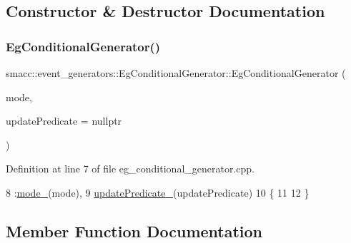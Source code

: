\subsection{Constructor \& Destructor Documentation}
\mbox{\label{classsmacc_1_1event__generators_1_1EgConditionalGenerator_aa21daec9774431387845be23fbcdfaa2}} 
\subsubsection{\texorpdfstring{Eg\+Conditional\+Generator()}{EgConditionalGenerator()}}
{\footnotesize\ttfamily smacc\+::event\+\_\+generators\+::\+Eg\+Conditional\+Generator\+::\+Eg\+Conditional\+Generator (\begin{DoxyParamCaption}\item[{\hyperlink{namespacesmacc_1_1event__generators_a1a57548759d7458f91c299f4fc2c5ea4}{Conditional\+Generator\+Mode}}]{mode,  }\item[{std\+::function$<$ \hyperlink{classbool}{bool}()$>$}]{update\+Predicate = {\ttfamily nullptr} }\end{DoxyParamCaption})}



Definition at line 7 of file eg\+\_\+conditional\+\_\+generator.\+cpp.


\begin{DoxyCode}
8             :\hyperlink{classsmacc_1_1event__generators_1_1EgConditionalGenerator_a5f3e7b602c4d250c54bec0d681d2cb80}{mode\_}(mode),
9             \hyperlink{classsmacc_1_1event__generators_1_1EgConditionalGenerator_a4e4092ecfa7278deda39e8ade6455362}{updatePredicate\_}(updatePredicate)
10         \{
11 
12         \}
\end{DoxyCode}


\subsection{Member Function Documentation}
\mbox{\label{classsmacc_1_1event__generators_1_1EgConditionalGenerator_a2a7e8a3818ffd1899682be9bbb8ae339}} 
